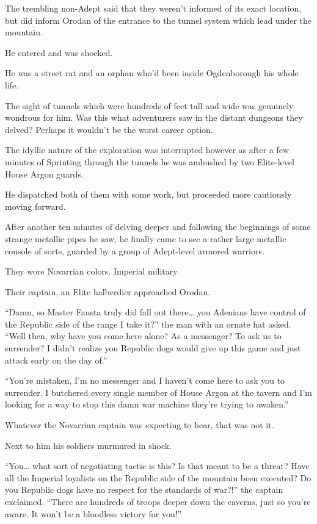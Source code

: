 \documentclass[a4paper,10pt]{book}
\begin{document}
The trembling non-Adept said that they weren’t informed of its exact location, but did inform Orodan of the entrance to the tunnel system which lead under the mountain.\par
He entered and was shocked.\par
He was a street rat and an orphan who’d been inside Ogdenborough his whole life.\par
The sight of tunnels which were hundreds of feet tall and wide was genuinely wondrous for him. Was this what adventurers saw in the distant dungeons they delved? Perhaps it wouldn’t be the worst career option.\par
The idyllic nature of the exploration was interrupted however as after a few minutes of Sprinting through the tunnels he was ambushed by two Elite-level House Argon guards.\par
He dispatched both of them with some work, but proceeded more cautiously moving forward.\par
After another ten minutes of delving deeper and following the beginnings of some strange metallic pipes he saw, he finally came to see a rather large metallic console of sorts, guarded by a group of Adept-level armored warriors.\par
They wore Novarrian colors. Imperial military.\par
Their captain, an Elite halberdier approached Orodan.\par
“Damn, so Master Fausta truly did fall out there… you Adenians have control of the Republic side of the range I take it?” the man with an ornate hat asked. “Well then, why have you come here alone? As a messenger? To ask us to surrender? I didn’t realize you Republic dogs would give up this game and just attack early on the day of.”\par
“You’re mistaken, I’m no messenger and I haven’t come here to ask you to surrender. I butchered every single member of House Argon at the tavern and I’m looking for a way to stop this damn war machine they’re trying to awaken.”\par
Whatever the Novarrian captain was expecting to hear, that was not it.\par
Next to him his soldiers murmured in shock.\par
“You… what sort of negotiating tactic is this? Is that meant to be a threat? Have all the Imperial loyalists on the Republic side of the mountain been executed? Do you Republic dogs have no respect for the standards of war?!” the captain exclaimed. “There are hundreds of troops deeper down the caverns, just so you’re aware. It won’t be a bloodless victory for you!”\par
\end{document}
